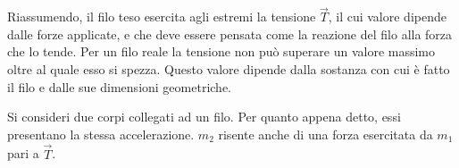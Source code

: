 Riassumendo, il filo teso esercita agli estremi la tensione $\vec{T}$, il cui valore dipende dalle forze applicate, e che deve essere pensata come la reazione del filo alla forza che lo tende. Per un filo reale la tensione non può superare un valore massimo oltre al quale esso si spezza. Questo valore dipende dalla sostanza con cui è fatto il filo e dalle sue dimensioni geometriche.

Si consideri due corpi collegati ad un filo. Per quanto appena detto, essi presentano la stessa accelerazione. $m_2$ risente anche di una forza esercitata da $m_1$ pari a $\vec{T}$.

\begin{figure}[htpb]
	\centering


	\begin{tikzpicture}[x=0.75pt,y=0.75pt,yscale=-1,xscale=1]


\end{tikzpicture}
\end{figure}

